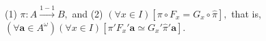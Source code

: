 (1) $\pi: A \xrightarrow{1-1} B,$
and
(2) $(\forall x \in I)[\pi \circ F_x = G_x \circ \hat{\pi}],$
that is, $(\forall \mathbf{a} \in A^\omega)(\forall x \in I)[\pi'F_x'\mathbf{a} \simeq G_x'\hat{\pi}'\mathbf{a}].$
